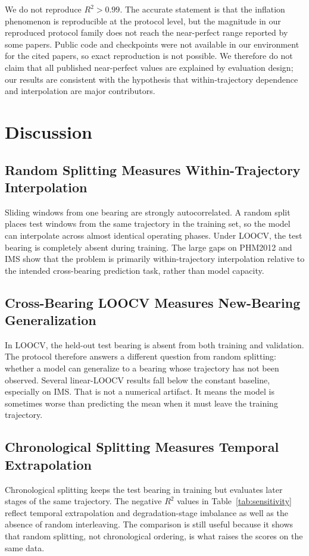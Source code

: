 \documentclass[pdflatex,sn-mathphys-num]{sn-jnl}
\begin{document}
We do not reproduce $R^2>0.99$. The accurate statement is that the inflation phenomenon is reproducible at the protocol level, but the magnitude in our reproduced protocol family does not reach the near-perfect range reported by some papers. Public code and checkpoints were not available in our environment for the cited papers, so exact reproduction is not possible. We therefore do not claim that all published near-perfect values are explained by evaluation design; our results are consistent with the hypothesis that within-trajectory dependence and interpolation are major contributors.

\section{Discussion}
\subsection{Random Splitting Measures Within-Trajectory Interpolation}
Sliding windows from one bearing are strongly autocorrelated. A random split places test windows from the same trajectory in the training set, so the model can interpolate across almost identical operating phases. Under LOOCV, the test bearing is completely absent during training. The large gaps on PHM2012 and IMS show that the problem is primarily within-trajectory interpolation relative to the intended cross-bearing prediction task, rather than model capacity.

\subsection{Cross-Bearing LOOCV Measures New-Bearing Generalization}
In LOOCV, the held-out test bearing is absent from both training and validation. The protocol therefore answers a different question from random splitting: whether a model can generalize to a bearing whose trajectory has not been observed. Several linear-LOOCV results fall below the constant baseline, especially on IMS. That is not a numerical artifact. It means the model is sometimes worse than predicting the mean when it must leave the training trajectory.

\subsection{Chronological Splitting Measures Temporal Extrapolation}
Chronological splitting keeps the test bearing in training but evaluates later stages of the same trajectory. The negative $R^2$ values in Table~\ref{tab:sensitivity} reflect temporal extrapolation and degradation-stage imbalance as well as the absence of random interleaving. The comparison is still useful because it shows that random splitting, not chronological ordering, is what raises the scores on the same data.
\end{document}
